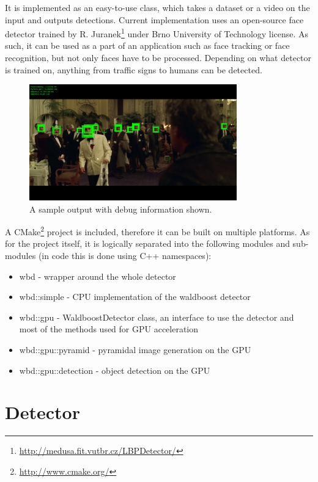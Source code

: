 It is implemented as an easy-to-use class, which takes a dataset or a video on the input and outputs detections. Current implementation uses an open-source face detector trained by R. Juranek\footnote{\url{http://medusa.fit.vutbr.cz/LBPDetector/}} under Brno University of Technology license. As such, it can be used as a part of an application such as face tracking or face recognition, but not only faces have to be processed. Depending on what detector is trained on, anything from traffic signs to humans can be detected.

\begin{center}
\begin{figure}[h]
	\centering\includegraphics[width=0.8\textwidth]{fig/sample.jpg}
	\caption{A sample output with debug information shown.}
	\label{fig:sample}
\end{figure}
\end{center}

A CMake\footnote{\url{http://www.cmake.org/}} project is included, therefore it can be built on multiple platforms. As for the project itself, it is logically separated into the following modules and sub-modules (in code this is done using C++ namespaces):

\begin{itemize}
	\item wbd - wrapper around the whole detector
	\item wbd::simple - CPU implementation of the waldboost detector
	\item wbd::gpu - WaldboostDetector class, an interface to use the detector and most of the methods used for GPU acceleration
	\item wbd::gpu::pyramid - pyramidal image generation on the GPU
	\item wbd::gpu::detection - object detection on the GPU
\end{itemize}

\section{Detector}\label{sec:detector}

